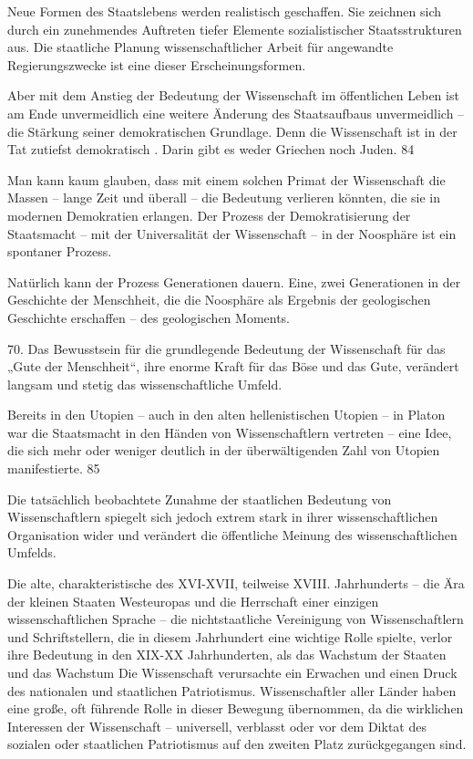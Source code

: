\documentclass[11pt,a4paper]{book}
\begin{document}
Neue Formen des Staatslebens werden realistisch geschaffen. Sie zeichnen sich durch ein zunehmendes Auftreten tiefer Elemente sozialistischer Staatsstrukturen aus. Die staatliche Planung wissenschaftlicher Arbeit für angewandte Regierungszwecke ist eine dieser Erscheinungsformen.



Aber mit dem Anstieg der Bedeutung der Wissenschaft im öffentlichen Leben ist am Ende unvermeidlich eine weitere Änderung des Staatsaufbaus unvermeidlich -- die Stärkung seiner demokratischen Grundlage. Denn die Wissenschaft ist in der Tat zutiefst demokratisch . Darin gibt es weder Griechen noch Juden. 84



Man kann kaum glauben, dass mit einem solchen Primat der Wissenschaft die Massen -- lange Zeit und überall -- die Bedeutung verlieren könnten, die sie in modernen Demokratien erlangen. Der Prozess der Demokratisierung der Staatsmacht -- mit der Universalität der Wissenschaft -- in der Noosphäre ist ein spontaner Prozess.



Natürlich kann der Prozess Generationen dauern. Eine, zwei Generationen in der Geschichte der Menschheit, die die Noosphäre als Ergebnis der geologischen Geschichte erschaffen -- des geologischen Moments.



70. Das Bewusstsein für die grundlegende Bedeutung der Wissenschaft für das „Gute der Menschheit“, ihre enorme Kraft für das Böse und das Gute, verändert langsam und stetig das wissenschaftliche Umfeld.



Bereits in den Utopien -- auch in den alten hellenistischen Utopien -- in Platon war die Staatsmacht in den Händen von Wissenschaftlern vertreten -- eine Idee, die sich mehr oder weniger deutlich in der überwältigenden Zahl von Utopien manifestierte. 85



Die tatsächlich beobachtete Zunahme der staatlichen Bedeutung von Wissenschaftlern spiegelt sich jedoch extrem stark in ihrer wissenschaftlichen Organisation wider und verändert die öffentliche Meinung des wissenschaftlichen Umfelds.



Die alte, charakteristische des XVI-XVII, teilweise XVIII. Jahrhunderts -- die Ära der kleinen Staaten Westeuropas und die Herrschaft einer einzigen wissenschaftlichen Sprache -- die nichtstaatliche Vereinigung von Wissenschaftlern und Schriftstellern, die in diesem Jahrhundert eine wichtige Rolle spielte, verlor ihre Bedeutung in den XIX-XX Jahrhunderten, als das Wachstum der Staaten und das Wachstum Die Wissenschaft verursachte ein Erwachen und einen Druck des nationalen und staatlichen Patriotismus. Wissenschaftler aller Länder haben eine große, oft führende Rolle in dieser Bewegung übernommen, da die wirklichen Interessen der Wissenschaft -- universell, verblasst oder vor dem Diktat des sozialen oder staatlichen Patriotismus auf den zweiten Platz zurückgegangen sind.
\end{document}
